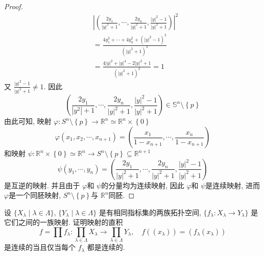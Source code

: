 \documentclass[../main.tex]{subfiles}
\begin{document}
\begin{proof}
\[    \begin{aligned}
    &\left| \left( \frac{2y_1 }{ \left| y \right|^{2}+ 1 },\cdots ,\frac{2y_{n} }{\left| y \right|^{2}+ 1  },\frac{\left| y \right|^{2}- 1  }{ \left| y \right|^{2}+  1 }    \right)  \right|^{2} \\ 
     &= \frac{4y_1^{2}+ \cdots + 4y_{n}^{2}+ \left( \left| y \right|^{2}-1  \right)^{2}  }{ \left( \left| y \right|^{2}+ 1  \right)^{2} }\\ 
      &= \frac{4\left| y \right|^{2}+ \left| y \right|^{4}-2\left| y \right|^{2}   + 1 }{\left( \left| y \right|^{2}+ 1  \right)^{2}  }= 1   
    \end{aligned}
    \]  又 \(  \frac{\left| y \right|^{2}-1  }{\left| y \right|^{2}+ 1  }\neq 1   \). 因此 \[
     \left( \frac{2y_1 }{\left| y^{2} \right|+ 1  }  ,\cdots ,\frac{2y_{n} }{\left| y \right|^{2}+ 1  }, \frac{\left| y \right|^{2} -1 }{\left| y \right|^{2}+ 1  }  \right)  \in \mathbb{S}^{n}\setminus \left\{ p \right\}
    \]由此可知, 映射 \(   \varphi : S^{n}\setminus \left\{ p \right\}\to \mathbb{R} ^{n}\simeq \mathbb{R} ^{n}\times \left\{ 0 \right\}  \) \[
     \varphi \left( x_1,x_2,\cdots ,x_{n+ 1} \right)= \left( \frac{x_1 }{1-x_{n+ 1} },\cdots ,\frac{x_{n} }{1-x_{n+ 1} }   \right)  
    \] 和映射 \(  \psi :\mathbb{R} ^{n}\times \left\{ 0 \right\}\simeq \mathbb{R} ^{n}\to S^{n}\setminus \left\{ p \right\}\subseteq \mathbb{R} ^{n+ 1}  \) \[
    \psi \left( y_1,\cdots ,y_{n} \right) = \left( \frac{2y_1 }{\left| y \right|^{2}+ 1  },\cdots ,\frac{2y_{n} }{\left| y \right|^{2}+ 1  },\frac{\left| y \right|^{2}-1  }{\left| y \right|^{2}+ 1  }    \right) 
    \] 是互逆的映射. 并且由于 \(   \varphi   \)和 \(  \psi   \)的分量均为连续映射, 因此 \(   \varphi   \)和 \(  \psi   \)是连续映射, 进而 \(   \varphi   \)是一个同胚映射,  \(  S^{n}\setminus \left\{ p \right\}  \)与 \(  \mathbb{R} ^{n}  \)同胚.       
\end{proof}

\begin{exercise}{}{}
设 $\{X_\lambda \mid \lambda \in \Lambda\}$, $\{Y_\lambda \mid \lambda \in \Lambda\}$ 是有相同指标集的两族拓扑空间, $\{f_\lambda: X_\lambda \to Y_\lambda\}$ 是它们之间的一族映射. 证明映射的直积
\[
f = \prod f_\lambda: \prod_{\lambda \in \Lambda} X_\lambda \to \prod_{\lambda \in \Lambda} Y_\lambda, \quad f((x_\lambda)) = (f_\lambda(x_\lambda))
\]
是连续的当且仅当每个 $f_\lambda$ 都是连续的.
\end{exercise}
\end{document}
